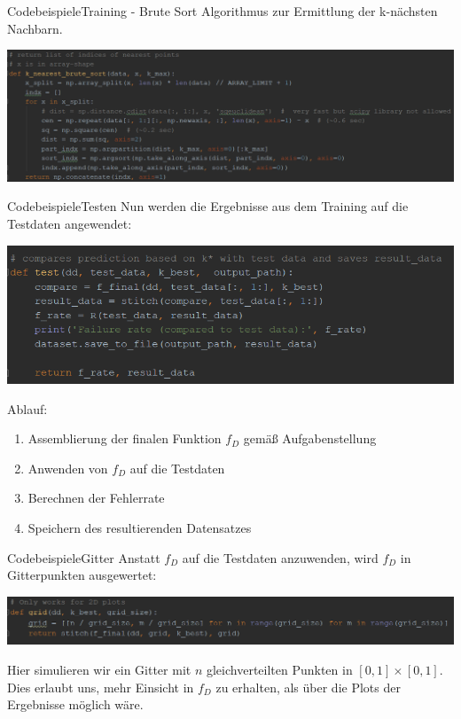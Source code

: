 \documentclass[9pt]{beamer}
\begin{document}
\begin{frame}{Codebeispiele}{Training - Brute Sort}
Algorithmus zur Ermittlung der k-nächsten Nachbarn.
\begin{center}
\includegraphics[scale=0.52]{assets/train_brute_sort_impl.png}
\end{center}
\end{frame}

\begin{frame}{Codebeispiele}{Testen}
Nun werden die Ergebnisse aus dem Training auf die Testdaten angewendet:
\begin{center}
\includegraphics[scale=0.75]{assets/test.png}
\end{center}
Ablauf:
\begin{enumerate}[1.]
\item{Assemblierung der finalen Funktion $f_D$ gemäß Aufgabenstellung}
\item{Anwenden von $f_D$ auf die Testdaten}
\item{Berechnen der Fehlerrate}
\item{Speichern des resultierenden Datensatzes}
\end{enumerate}
\end{frame}

\begin{frame}{Codebeispiele}{Gitter}
Anstatt $f_D$ auf die Testdaten anzuwenden, wird $f_D$ in Gitterpunkten ausgewertet: 
\begin{center}
\includegraphics[scale=0.5]{assets/grid.png}
\end{center}
Hier simulieren wir ein Gitter mit $n$ gleichverteilten Punkten in $[0, 1] \times [0, 1]$.\\[0.4em]
Dies erlaubt uns, mehr Einsicht in $f_D$ zu erhalten, als über die Plots der Ergebnisse möglich wäre.
\end{frame}
\end{document}
